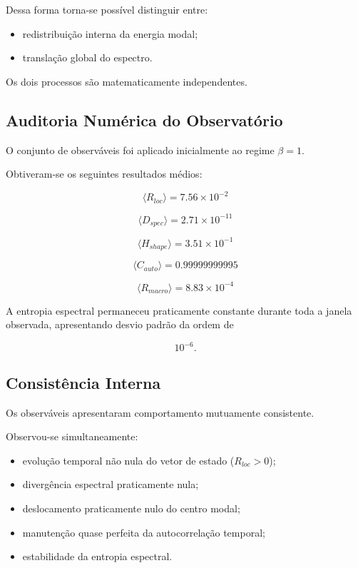 \documentclass[11pt,a4paper]{article}
\begin{document}
Dessa forma torna-se possível distinguir entre:

\begin{itemize}

\item redistribuição interna da energia modal;

\item translação global do espectro.

\end{itemize}

Os dois processos são matematicamente independentes.


\subsection{Auditoria Numérica do Observatório}

O conjunto de observáveis foi aplicado inicialmente ao regime
\(\beta=1\).

Obtiveram-se os seguintes resultados médios:

\[
\langle R_{loc}\rangle
=
7.56\times10^{-2}
\]

\[
\langle D_{spec}\rangle
=
2.71\times10^{-11}
\]

\[
\langle H_{shape}\rangle
=
3.51\times10^{-1}
\]

\[
\langle C_{auto}\rangle
=
0.99999999995
\]

\[
\langle R_{macro}\rangle
=
8.83\times10^{-4}
\]

A entropia espectral permaneceu praticamente constante durante toda a
janela observada, apresentando desvio padrão da ordem de

\[
10^{-6}.
\]


\subsection{Consistência Interna}

Os observáveis apresentaram comportamento mutuamente consistente.

Observou-se simultaneamente:

\begin{itemize}

\item evolução temporal não nula do vetor de estado
(\(R_{loc}>0\));

\item divergência espectral praticamente nula;

\item deslocamento praticamente nulo do centro modal;

\item manutenção quase perfeita da autocorrelação temporal;

\item estabilidade da entropia espectral.

\end{itemize}
\end{document}
